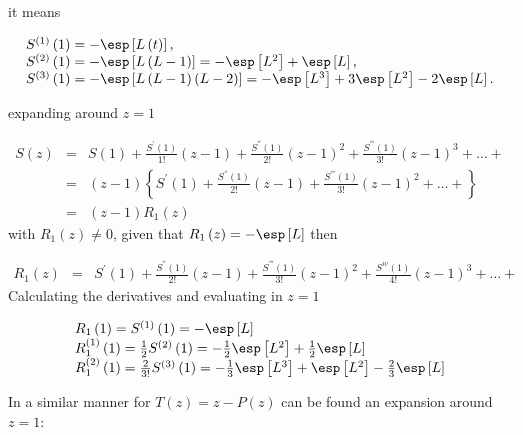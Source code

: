 it means

\begin{eqnarray}
\begin{array}{l}
S^{(1)}\left(1\right)=-\esp\left[L\left(t\right)\right],\\ S^{(2)}\left(1\right)=-\esp\left[L\left(L-1\right)\right]
=-\esp\left[L^{2}\right]+\esp\left[L\right],\\
S^{(3)}\left(1\right)=-\esp\left[L\left(L-1\right)\left(L-2\right)\right]
=-\esp\left[L^{3}\right]+3\esp\left[L^{2}\right]-2\esp\left[L\right].
\end{array}
\end{eqnarray}


expanding around $z=1$

\begin{eqnarray*}
S\left(z\right)&=&S\left(1\right)+\frac{S^{'}\left(1\right)}{1!}\left(z-1\right)+\frac{S^{''}\left(1\right)}{2!}\left(z-1\right)^{2}+\frac{S^{'''}\left(1\right)}{3!}\left(z-1\right)^{3}+\ldots+\\
&=&\left(z-1\right)\left\{S^{'}\left(1\right)+\frac{S^{''}\left(1\right)}{2!}\left(z-1\right)+\frac{S^{'''}\left(1\right)}{3!}\left(z-1\right)^{2}+\ldots+\right\}\\
&=&\left(z-1\right)R_{1}\left(z\right)
\end{eqnarray*}
with $R_{1}\left(z\right)\neq0$, given that $R_{1}\left(z\right)=-\esp\left[L\right]$ then

\begin{eqnarray}
R_{1}\left(z\right)&=&S^{'}\left(1\right)+\frac{S^{''}\left(1\right)}{2!}\left(z-1\right)+\frac{S^{'''}\left(1\right)}{3!}\left(z-1\right)^{2}+\frac{S^{iv}\left(1\right)}{4!}\left(z-1\right)^{3}+\ldots+
\end{eqnarray}
Calculating the derivatives and evaluating in $z=1$

\begin{eqnarray}
\begin{array}{l}
R_{1}\left(1\right)=S^{(1)}\left(1\right)=-\esp\left[L\right]\\
R_{1}^{(1)}\left(1\right)=\frac{1}{2}S^{(2)}\left(1\right)=-\frac{1}{2}\esp\left[L^{2}\right]+\frac{1}{2}\esp\left[L\right]\\
R_{1}^{(2)}\left(1\right)=\frac{2}{3!}S^{(3)}\left(1\right)
=-\frac{1}{3}\esp\left[L^{3}\right]+\esp\left[L^{2}\right]-\frac{2}{3}\esp\left[L\right]
\end{array}
\end{eqnarray}

In a similar manner for $T\left(z\right)=z-P\left(z\right)$ can be found an expansion around $z=1$:

